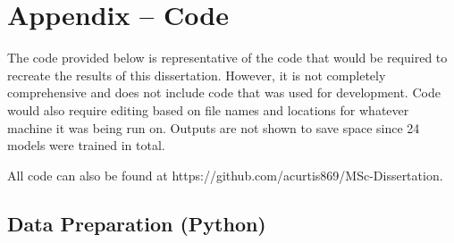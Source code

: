 \documentclass[11pt]{article}
\begin{document}
\newpage

\appendix
\section{Appendix -- Code}

The code provided below is representative of the code that would be required to recreate the results of this dissertation. However, it is not completely comprehensive and does not include code that was used for development. Code would also require editing based on file names and locations for whatever machine it was being run on. Outputs are not shown to save space since 24 models were trained in total.

\bigskip

All code can also be found at https://github.com/acurtis869/MSc-Dissertation.

\subsection{Data Preparation (Python)}
\end{document}

